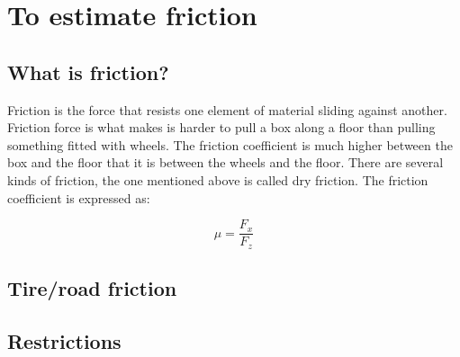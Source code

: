 \chapter{To estimate friction}

\section{What is friction?}
Friction is the force that resists one element of material sliding against another. Friction force is what makes is harder to pull a box along a floor than pulling something fitted with wheels. The friction coefficient is much higher between the box and the floor that it is between the wheels and the floor. There are several kinds of friction, the one mentioned above is called dry friction. The friction coefficient is expressed as:

\begin{equation}
\mu=\frac{F_{x}}{F_{z}}
\end{equation}




\section{Tire/road friction}

\section{Restrictions}

